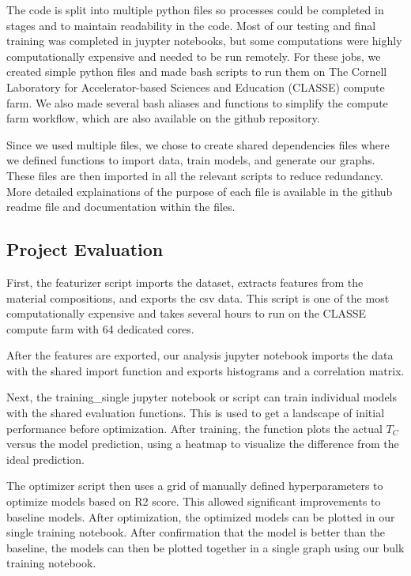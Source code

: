 \documentclass[twocolumn, nofootinbib, secnumarabic, amssymb, nobibnotes, aps, prd]{revtex4-2}
\begin{document}
The code is split into multiple python files so processes could be completed in stages and to maintain readability in the code. Most of our testing and final training was completed in juypter notebooks, but some computations were highly computationally expensive and needed to be run remotely. For these jobs, we created simple python files and made bash scripts to run them on The Cornell Laboratory for Accelerator-based Sciences and Education (CLASSE) compute farm. We also made several bash aliases and functions to simplify the compute farm workflow, which are also available on the github repository. 

Since we used multiple files, we chose to create shared dependencies files where we defined functions to import data, train models, and generate our graphs. These files are then imported in all the relevant scripts to reduce redundancy. More detailed explainations of the purpose of each file is available in the github readme file and documentation within the files.

\subsection{Project Evaluation}

First, the featurizer script imports the dataset, extracts features from the material compositions, and exports the csv data. This script is one of the most computationally expensive and takes several hours to run on the CLASSE compute farm with 64 dedicated cores.

After the features are exported, our analysis jupyter notebook imports the data with the shared import function and exports histograms and a correlation matrix. 

Next, the training\_single jupyter notebook or script can train individual models with the shared evaluation functions. This is used to get a landscape of initial performance before optimization. After training, the function plots the actual $T_C$ versus the model prediction, using a heatmap to visualize the difference from the ideal prediction.

The optimizer script then uses a grid of manually defined hyperparameters to optimize models based on R2 score. This allowed significant improvements to baseline models. After optimization, the optimized models can be plotted in our single training notebook. After confirmation that the model is better than the baseline, the models can then be plotted together in a single graph using our bulk training notebook. 
\end{document}
